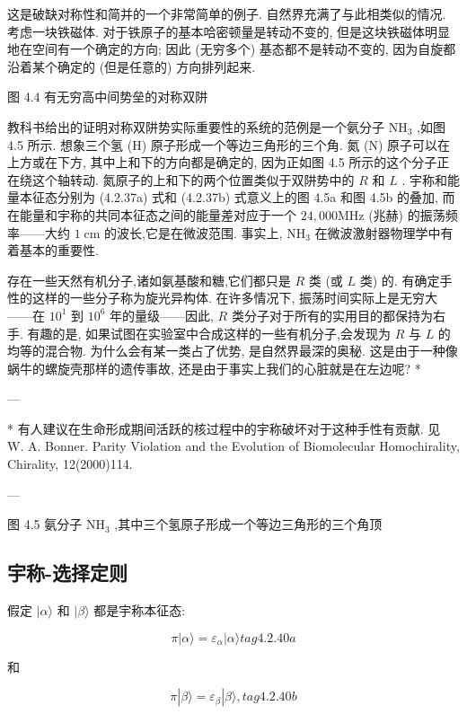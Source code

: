 这是破缺对称性和简并的一个非常简单的例子. 自然界充满了与此相类似的情况. 考虑一块铁磁体. 对于铁原子的基本哈密顿量是转动不变的, 但是这块铁磁体明显地在空间有一个确定的方向; 因此 (无穷多个) 基态都不是转动不变的, 因为自旋都沿着某个确定的 (但是任意的) 方向排列起来.



图 4.4 有无穷高中间势垒的对称双阱

教科书给出的证明对称双阱势实际重要性的系统的范例是一个氨分子 ${\mathrm{{NH}}}_{3}$ ,如图 4.5 所示. 想象三个氢 (H) 原子形成一个等边三角形的三个角. 氮 (N) 原子可以在上方或在下方, 其中上和下的方向都是确定的, 因为正如图 4.5 所示的这个分子正在绕这个轴转动. 氮原子的上和下的两个位置类似于双阱势中的 $R$ 和 $L$ . 宇称和能量本征态分别为 (4.2.37a) 式和 (4.2.37b) 式意义上的图 4.5a 和图 4.5b 的叠加, 而在能量和宇称的共同本征态之间的能量差对应于一个 ${24},{000}\mathrm{{MHz}}$ (兆赫) 的振荡频率——大约 $1\mathrm{\;{cm}}$ 的波长,它是在微波范围. 事实上, ${\mathrm{{NH}}}_{3}$ 在微波激射器物理学中有着基本的重要性.

存在一些天然有机分子,诸如氨基酸和糖,它们都只是 $R$ 类 (或 $L$ 类) 的. 有确定手性的这样的一些分子称为旋光异构体. 在许多情况下, 振荡时间实际上是无穷大——在 ${10}^{1}$ 到 ${10}^{6}$ 年的量级——因此, $R$ 类分子对于所有的实用目的都保持为右手. 有趣的是, 如果试图在实验室中合成这样的一些有机分子,会发现为 $R$ 与 $L$ 的均等的混合物. 为什么会有某一类占了优势, 是自然界最深的奥秘. 这是由于一种像蜗牛的螺旋壳那样的遗传事故, 还是由于事实上我们的心脏就是在左边呢? *

---

* 有人建议在生命形成期间活跃的核过程中的宇称破坏对于这种手性有贡献. 见 W. A. Bonner. Parity Violation and the Evolution of Biomolecular Homochirality, Chirality, 12(2000)114.

---


图 4.5 氨分子 ${\mathrm{{NH}}}_{3}$ ,其中三个氢原子形成一个等边三角形的三个角顶

\subsection{宇称-选择定则}

假定 $|\alpha \rangle$ 和 $|\beta \rangle$ 都是宇称本征态:

$$
\pi \left| {\alpha \rangle = {\varepsilon }_{\alpha }}\right| \alpha \rangle tag{4.2.40a}
$$

和

$$
\pi \left| {\beta \rangle = {\varepsilon }_{\beta }}\right| \beta \rangle , tag{4.2.40b}
$$

